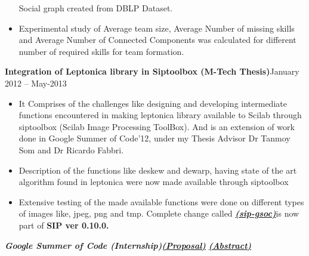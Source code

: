 \documentclass[margin,line]{res}
\begin{document}
\begin{resume}
\begin{itemize}
Social graph created from DBLP Dataset.
\item Experimental study of Average team size, Average Number of missing skills and Average Number of Connected Components was calculated for different number of required skills for team formation.
\end{itemize}
\vspace{0.8 mm}
{\bf Integration of Leptonica library in Siptoolbox (M-Tech Thesis)}\hfill {January 2012 -- May-2013}
\begin{itemize} %
  \setlength{\itemsep}{0.01pt}
  \setlength{\parskip}{0pt}
  \setlength{\parsep}{0pt}
\item It Comprises of the challenges like designing and developing intermediate functions encountered in making leptonica library available to Scilab through siptoolbox (Scilab Image Processing ToolBox). And is an extension of work done in Google Summer of Code'12, under my Thesis Advisor Dr Tanmoy Som and Dr Ricardo Fabbri.
\item Description of the functions like deskew and dewarp, having state of the art algorithm found in leptonica were now made available through siptoolbox
\item Extensive testing of the made available functions were done on different types of images like, jpeg, png and tmp. Complete change called \href{http://www.google-melange.com/gsoc/proposal/public/google/gsoc2012/mady902/5668600916475904}{\em {\bf (sip-gsoc)}}is now part of {\bf SIP ver 0.10.0.}
\end{itemize}
{\bf {\em Google Summer of Code (Internship)}}\href{http://www.google-melange.com/gsoc/proposal/public/google/gsoc2012/mady902/5668600916475904}{\em {\bf (Proposal)}}
\href{http://www.google-melange.com/gsoc/project/details/google/gsoc2012/mady902/5741031244955648}{\em {\bf (Abstract)}}

\end{resume}
\end{document}
